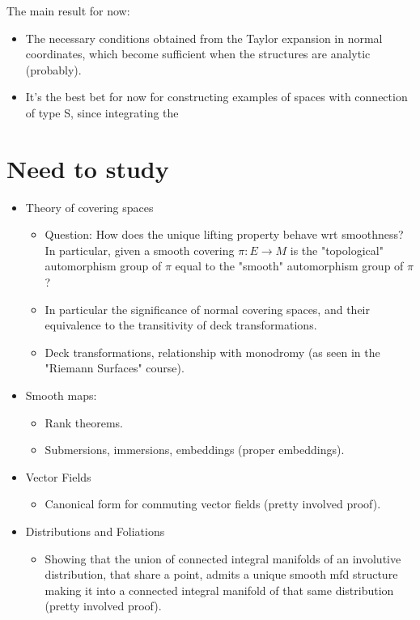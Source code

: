 \documentclass{report}
\theoremstyle{definition}
\begin{document}
The main result for now:
\begin{itemize}
    \item The necessary conditions obtained from the Taylor expansion in normal coordinates, which become sufficient when the structures are analytic (probably).
    \item It's the best bet for now for constructing examples of spaces with connection of type S, since integrating the 
\end{itemize}

\section{Need to study}

\begin{itemize}
    \item Theory of covering spaces
    \begin{itemize}
        \item Question: How does the unique lifting property behave wrt smoothness? In particular, given a smooth covering $\pi:E\to M$ is the "topological" automorphism group of $\pi$ equal to the "smooth" automorphism group of $\pi$?
        \item In particular the significance of normal covering spaces, and their equivalence to the transitivity of deck transformations.
        \item Deck transformations, relationship with monodromy (as seen in the "Riemann Surfaces" course).
    \end{itemize}
    \item Smooth maps:
    \begin{itemize}
        \item Rank theorems.
        \item Submersions, immersions, embeddings (proper embeddings).
    \end{itemize}
    \item Vector Fields
    \begin{itemize}
        \item Canonical form for commuting vector fields (pretty involved proof).
    \end{itemize}
    \item Distributions and Foliations
    \begin{itemize}
        \item Showing that the union of connected integral manifolds of an involutive distribution, that share a point, admits a unique smooth mfd structure making it into a connected integral manifold of that same distribution (pretty involved proof).

\end{itemize}
\end{itemize}
\end{document}
